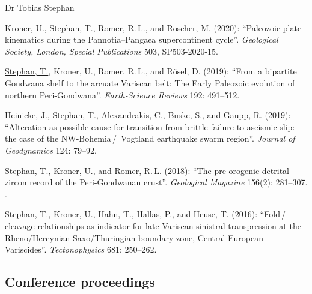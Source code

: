 \documentclass[10pt, paper=letter]{scrartcl} %
\begin{document}
\begin{cv}{\textcolor{myred}{\textsf{Dr Tobias Stephan}}}
\begin{cvlist}{}
        \item[5] Kroner, U., \ul{Stephan, T.}, Romer, R.\,L., and Roscher, M. (2020): \enquote{Paleozoic plate kinematics during the Pannotia--Pangaea supercontinent cycle}. \textit{Geological Society, London, Special Publications} 503, SP503-2020-15. 
        \item[4] \ul{Stephan, T.}, Kroner, U., Romer, R.\,L., and R\"osel, D. (2019): \enquote{From a bipartite Gondwana shelf to the arcuate Variscan belt: The Early Paleozoic evolution of northern Peri-Gondwana}. \textit{Earth-Science Reviews} 192: 491--512. 
        \item[3] Heinicke, J., \ul{Stephan, T.}, Alexandrakis, C., Buske, S., and Gaupp, R. (2019): \enquote{Alteration as possible cause for transition from brittle failure to aseismic slip: the case of the NW-Bohemia\,/\, Vogtland earthquake swarm region}. \textit{Journal of Geodynamics} 124: 79--92. 
        \item[2] \ul{Stephan, T.}, Kroner, U., and Romer, R.\,L. (2018): \enquote{The pre-orogenic detrital zircon record of the Peri-Gondwanan crust}. \textit{Geological Magazine} 156(2): 281--307. 
        .
        \item[1] \ul{Stephan, T.}, Kroner, U., Hahn, T., Hallas, P., and Heuse, T. (2016): \enquote{Fold\,/\,cleavage relationships as indicator for late Variscan sinistral transpression at the Rheno\-/Hercynian\--Saxo\-/Thuringian boundary zone, Central European Variscides}. \textit{Tectonophysics} 681: 250--262. 
    \end{cvlist}
    \endgroup

    \subsection{Conference proceedings}


\end{cv}
\end{document}
